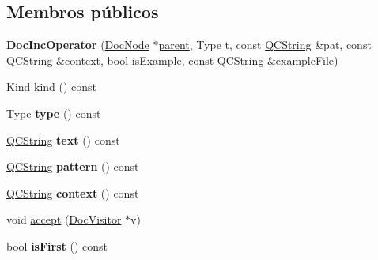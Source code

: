 \subsection*{Membros públicos}
\begin{DoxyCompactItemize}
\item 
\hypertarget{class_doc_inc_operator_a0e27457501634cc8b8087b23540eb395}{{\bfseries Doc\-Inc\-Operator} (\hyperlink{class_doc_node}{Doc\-Node} $\ast$\hyperlink{class_doc_node_abd7f070d6b0a38b4da71c2806578d19d}{parent}, Type t, const \hyperlink{class_q_c_string}{Q\-C\-String} \&pat, const \hyperlink{class_q_c_string}{Q\-C\-String} \&context, bool is\-Example, const \hyperlink{class_q_c_string}{Q\-C\-String} \&example\-File)}\label{class_doc_inc_operator_a0e27457501634cc8b8087b23540eb395}

\item 
\hyperlink{class_doc_node_aa10c9e8951b8ccf714a59ec321bdac5b}{Kind} \hyperlink{class_doc_inc_operator_aa9d037bed9f9a083d0cd01485637d843}{kind} () const 
\item 
\hypertarget{class_doc_inc_operator_afbd0fa31db28593e9669c3c56711c0a7}{Type {\bfseries type} () const }\label{class_doc_inc_operator_afbd0fa31db28593e9669c3c56711c0a7}

\item 
\hypertarget{class_doc_inc_operator_a367883e6ba4151924745ee021c01b5e7}{\hyperlink{class_q_c_string}{Q\-C\-String} {\bfseries text} () const }\label{class_doc_inc_operator_a367883e6ba4151924745ee021c01b5e7}

\item 
\hypertarget{class_doc_inc_operator_af38e77edbe06b9cb201001d58a50f49d}{\hyperlink{class_q_c_string}{Q\-C\-String} {\bfseries pattern} () const }\label{class_doc_inc_operator_af38e77edbe06b9cb201001d58a50f49d}

\item 
\hypertarget{class_doc_inc_operator_a4d6bb4ed13678cf22ef5cb414076d9f5}{\hyperlink{class_q_c_string}{Q\-C\-String} {\bfseries context} () const }\label{class_doc_inc_operator_a4d6bb4ed13678cf22ef5cb414076d9f5}

\item 
void \hyperlink{class_doc_inc_operator_a7ba716e854ae2f8f87a4eb2140e302b6}{accept} (\hyperlink{class_doc_visitor}{Doc\-Visitor} $\ast$v)
\item 
\hypertarget{class_doc_inc_operator_af018468130393cdae58e14a36980f94c}{bool {\bfseries is\-First} () const }\label{class_doc_inc_operator_af018468130393cdae58e14a36980f94c}


\end{DoxyCompactItemize}
